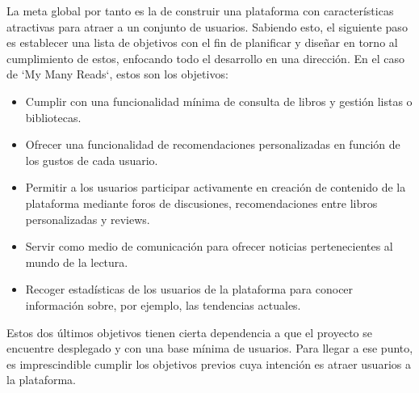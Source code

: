 La meta global por tanto es la de construir una plataforma con características atractivas para atraer a un conjunto de usuarios. Sabiendo esto, el siguiente paso es establecer una lista de objetivos con el fin de planificar y diseñar en torno al cumplimiento de estos, enfocando todo el desarrollo en una dirección. En el caso de `My Many Reads`, estos son los objetivos:

\begin{itemize}
    \item Cumplir con una funcionalidad mínima de consulta de libros y gestión listas o bibliotecas.
    \item Ofrecer una funcionalidad de recomendaciones personalizadas en función de los gustos de cada usuario.
    \item Permitir a los usuarios participar activamente en creación de contenido de la plataforma mediante foros de discusiones, recomendaciones entre libros personalizadas y reviews.
    \item Servir como medio de comunicación para ofrecer noticias pertenecientes al mundo de la lectura.
    \item Recoger estadísticas de los usuarios de la plataforma para conocer información sobre, por ejemplo, las tendencias actuales.
\end{itemize}

Estos dos últimos objetivos tienen cierta dependencia a que el proyecto se encuentre desplegado y con una base mínima de usuarios. Para llegar a ese punto, es imprescindible cumplir los objetivos previos cuya intención es atraer usuarios a la plataforma.
